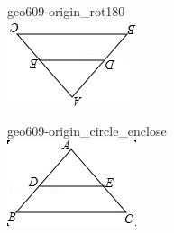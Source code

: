 \documentclass[12pt]{article}
\begin{document}
\begin{center}
\begin{minipage}{0.32\textwidth}
\end{minipage}
\par\medskip
\begin{minipage}{0.32\textwidth}\centering
geo609-origin\_rot180\\
\includegraphics[width=0.95\linewidth]{out_rommath_origin/items/geo609-origin/assets/figure_rot180.png}
\end{minipage}
\hfill\begin{minipage}{0.32\textwidth}\centering
geo609-origin\_circle\_enclose\\
\includegraphics[width=0.95\linewidth]{out_rommath_origin/items/geo609-origin/assets/figure_circle.png}
\end{minipage}
\par
\end{center}
\bigskip
\end{document}
